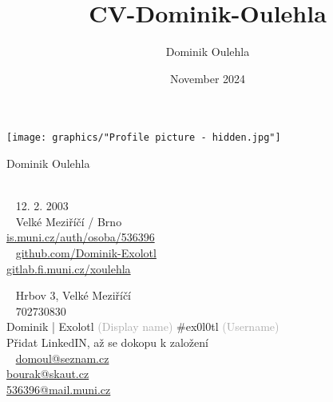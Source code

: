 \documentclass{modernsimplecv}
\title{CV-Dominik-Oulehla}
\author{Dominik Oulehla}
\date{November 2024}
\begin{document}
\thispagestyle{empty}




\begin{minipage}[t]{0.21\textwidth}
\vspace{0pt} %
\texttt{[image: graphics/"Profile picture - hidden.jpg"]}\hspace{1em}
\end{minipage}
\hfill
\begin{minipage}[t]{0.77\textwidth}
\vspace{0pt} %
\begin{shaded*}

\begin{minipage}[t]{0.4\textwidth}
\vspace{0pt} %
{\par\centering\huge\textsf{Dominik Oulehla}} \\[0.3cm]
\faBirthdayCake~ 12. 2. 2003 \\
\faMapMarker~ Velké Meziříčí / Brno \\

{\small
 \protect\url{is.muni.cz/auth/osoba/536396} \\
\faGithub~ \protect\url{github.com/Dominik-Exolotl} \\
 \protect\url{gitlab.fi.muni.cz/xoulehla}
}
\end{minipage}\hfill
\begin{minipage}[t]{0.55\textwidth}
\vspace{0pt}
\faEnvelopeO~ Hrbov 3, Velké Meziříčí \\
\faPhone~ 702730830 \\
 Dominik | Exolotl \scriptsize \textcolor{darkgrey}{(Display name)}\normalsize{ \#ex0l0tl} \scriptsize \textcolor{darkgrey}{(Username)} \normalsize\\
 \small{Přidat LinkedIN, až se dokopu k založení} \normalsize \\[0.175cm]

\large
\faAt~ \protect\url{domoul@seznam.cz}\\
 \protect\url{bourak@skaut.cz} \\
 \protect\url{536396@mail.muni.cz} \normalsize\\
\end{minipage}
\hfill
\end{shaded*}
\end{minipage}\\[15pt]
\end{document}
